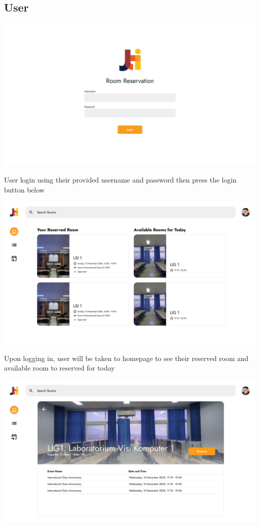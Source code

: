 \documentclass[12pt,titlepage,a4paper]{report}
\begin{document}
    \subsection{User}
    \begin{center}
        \includegraphics[width=\textwidth]{images/figures/UIUX/login.png}\\
    \end{center}
    User login using their provided username and password then press the login button below
    \begin{center}
        \includegraphics[width=\textwidth]{images/figures/UIUX/home.png}\\
    \end{center}
    Upon logging in, user will be taken to homepage to see their reserved room and available room to reserved for today
    \begin{center}
        \includegraphics[width=\textwidth]{images/figures/UIUX/daroom.png}\\
    \end{center}
\end{document}
